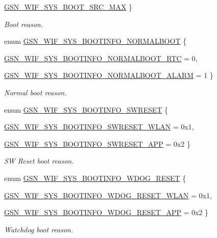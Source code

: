 \begin{DoxyCompactItemize}
\par
\hyperlink{a00639_gga36af0a76d3b3d7cad5c5dd1f60c39091a3105a241e957797a7f6042c7c77b197c}{GSN\_\-WIF\_\-SYS\_\-BOOT\_\-SRC\_\-MAX}
 \}
\begin{DoxyCompactList}\small\item\em Boot reason. \end{DoxyCompactList}\item 
enum \hyperlink{a00639_gaf19dc62e1c923b6383337e8e8296c242}{GSN\_\-WIF\_\-SYS\_\-BOOTINFO\_\-NORMALBOOT} \{ \par
\hyperlink{a00639_ggaf19dc62e1c923b6383337e8e8296c242aaa34679749818c0b6b49589c05b1d2d8}{GSN\_\-WIF\_\-SYS\_\-BOOTINFO\_\-NORMALBOOT\_\-RTC} =  0, 
\par
\hyperlink{a00639_ggaf19dc62e1c923b6383337e8e8296c242ab0c3999cf0b0db563677fc197d848d5f}{GSN\_\-WIF\_\-SYS\_\-BOOTINFO\_\-NORMALBOOT\_\-ALARM} =  1
 \}
\begin{DoxyCompactList}\small\item\em Normal boot reason. \end{DoxyCompactList}\item 
enum \hyperlink{a00639_ga9d8caf6999c8508aaf8d3b414693a0a2}{GSN\_\-WIF\_\-SYS\_\-BOOTINFO\_\-SWRESET} \{ \par
\hyperlink{a00639_gga9d8caf6999c8508aaf8d3b414693a0a2a5fa5611bcc8a6b4df4bd0210e6f861d0}{GSN\_\-WIF\_\-SYS\_\-BOOTINFO\_\-SWRESET\_\-WLAN} =  0x1, 
\par
\hyperlink{a00639_gga9d8caf6999c8508aaf8d3b414693a0a2ae91706337a69766a937c6ce4d5934cdd}{GSN\_\-WIF\_\-SYS\_\-BOOTINFO\_\-SWRESET\_\-APP} =  0x2
 \}
\begin{DoxyCompactList}\small\item\em SW Reset boot reason. \end{DoxyCompactList}\item 
enum \hyperlink{a00639_ga93cc8ed01d7724e043b553774ec3df16}{GSN\_\-WIF\_\-SYS\_\-BOOTINFO\_\-WDOG\_\-RESET} \{ \par
\hyperlink{a00639_gga93cc8ed01d7724e043b553774ec3df16a5b3dea32336a204e17485b63635d0fba}{GSN\_\-WIF\_\-SYS\_\-BOOTINFO\_\-WDOG\_\-RESET\_\-WLAN} =  0x1, 
\par
\hyperlink{a00639_gga93cc8ed01d7724e043b553774ec3df16ab015077ed326c799fa21c7fc48115940}{GSN\_\-WIF\_\-SYS\_\-BOOTINFO\_\-WDOG\_\-RESET\_\-APP} =  0x2
 \}
\begin{DoxyCompactList}\small\item\em Watchdog boot reason. \end{DoxyCompactList}\item 

\end{DoxyCompactItemize}
